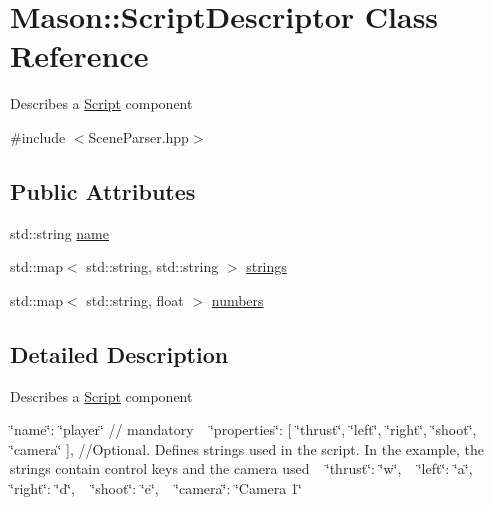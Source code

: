 \hypertarget{class_mason_1_1_script_descriptor}{}\section{Mason\+:\+:Script\+Descriptor Class Reference}
\label{class_mason_1_1_script_descriptor}


Describes a \hyperlink{class_mason_1_1_script}{Script} component ~\newline
  




{\ttfamily \#include $<$Scene\+Parser.\+hpp$>$}

\subsection*{Public Attributes}
\begin{DoxyCompactItemize}
\item 
std\+::string \hyperlink{class_mason_1_1_script_descriptor_aa04b0220bbef995dce7e14a778449460}{name}
\item 
std\+::map$<$ std\+::string, std\+::string $>$ \hyperlink{class_mason_1_1_script_descriptor_a426d001b44ece88ba6b465b0505724c4}{strings}
\item 
std\+::map$<$ std\+::string, float $>$ \hyperlink{class_mason_1_1_script_descriptor_a536144088cd6770fb4f63fe502d89e3e}{numbers}
\end{DoxyCompactItemize}


\subsection{Detailed Description}
Describes a \hyperlink{class_mason_1_1_script}{Script} component ~\newline
 

\char`\"{}name\char`\"{}\+: \char`\"{}player\char`\"{} // mandatory ~\newline
 \char`\"{}properties\char`\"{}\+: \mbox{[} \char`\"{}thrust\char`\"{}, \char`\"{}left\char`\"{}, \char`\"{}right\char`\"{}, \char`\"{}shoot\char`\"{}, \char`\"{}camera\char`\"{} \mbox{]}, //\+Optional. Defines strings used in the script. In the example, the strings contain control keys and the camera used ~\newline
 \char`\"{}thrust\char`\"{}\+: \char`\"{}w\char`\"{}, ~\newline
 \char`\"{}left\char`\"{}\+: \char`\"{}a\char`\"{}, ~\newline
 \char`\"{}right\char`\"{}\+: \char`\"{}d\char`\"{}, ~\newline
 \char`\"{}shoot\char`\"{}\+: \char`\"{}e\char`\"{}, ~\newline
 \char`\"{}camera\char`\"{}\+: \char`\"{}\+Camera 1\char`\"{} ~\newline
 

